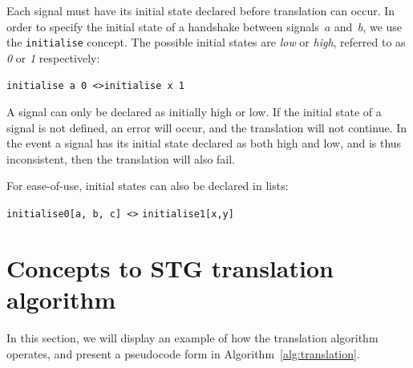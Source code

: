 \documentclass[british,conference,compsoc]{IEEEtran}
\begin{document}
Each signal must have its initial state declared before translation can occur. 
In order to specify the initial state of a handshake between signals~$a$
and~$b$, we use the \texttt{initialise} concept.
The possible initial states are \emph{low} or \emph{high}, referred to as 
\emph{0} or \emph{1} respectively:

\vspace{-1mm}

\begin{center}
   \texttt{initialise a 0 <>}\texttt{initialise x 1}
\end{center}

\vspace{-1mm}

\noindent A signal can only be declared as initially high or low. If the 
initial state of a signal is not defined, an error will occur, and the 
translation will not continue. In the event a signal has its 
initial state declared as both high and low, and is thus inconsistent, then the translation will also fail.

For ease-of-use, initial states can also be declared in lists:

\begin{center}
\texttt{initialise0[a, b, c] <>} \texttt{initialise1[x,y]}
\end{center}

\vspace{-2mm}

\section{Concepts to STG translation algorithm\label{sec:algorithm}}

\vspace{-2mm}

In this section, we will display an example of how the translation algorithm 
operates, and present a pseudocode form in Algorithm~\ref{alg:translation}. 

\vspace{-2mm}
\end{document}
